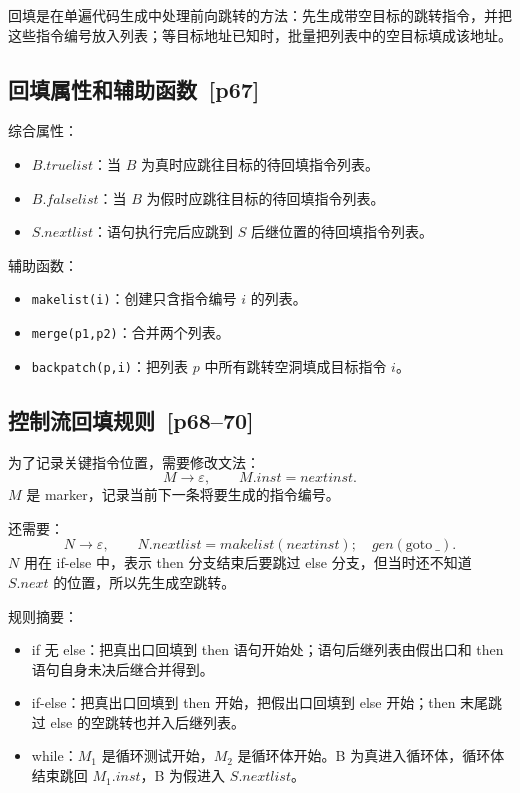 \documentclass[UTF8,fontset=none,11pt]{ctexart}
\newenvironment{defbox}[1][]{%
  \par\medskip\noindent{\color{defrule}\rule{\linewidth}{1.1pt}}\par\nopagebreak
  \noindent{\bfseries\color{defrule}#1}\par\nopagebreak\smallskip}%
  {\par\nopagebreak\smallskip\noindent{\color{defrule}\rule{\linewidth}{0.4pt}}\par\medskip}
\newcommand{\pg}[1]{\texorpdfstring{{\small\color{graytext}\,[p#1]}}{ [p#1]}}
\newcommand{\eps}{\varepsilon}
\begin{document}
\begin{defbox}[Backpatching]
回填是在单遍代码生成中处理前向跳转的方法：先生成带空目标的跳转指令，并把这些指令编号放入列表；等目标地址已知时，批量把列表中的空目标填成该地址。
\end{defbox}

\subsection{回填属性和辅助函数 \pg{67}}

综合属性：

\begin{itemize}
  \item \(B.truelist\)：当 \(B\) 为真时应跳往目标的待回填指令列表。
  \item \(B.falselist\)：当 \(B\) 为假时应跳往目标的待回填指令列表。
  \item \(S.nextlist\)：语句执行完后应跳到 \(S\) 后继位置的待回填指令列表。
\end{itemize}

辅助函数：

\begin{itemize}
  \item \texttt{makelist(i)}：创建只含指令编号 \(i\) 的列表。
  \item \texttt{merge(p1,p2)}：合并两个列表。
  \item \texttt{backpatch(p,i)}：把列表 \(p\) 中所有跳转空洞填成目标指令 \(i\)。
\end{itemize}

\subsection{控制流回填规则 \pg{68--70}}

为了记录关键指令位置，需要修改文法：
\[
M\to\eps,\qquad M.inst=nextinst.
\]
\(M\) 是 marker，记录当前下一条将要生成的指令编号。

还需要：
\[
N\to\eps,\qquad N.nextlist=makelist(nextinst);\quad gen(\mathrm{goto}\ \_).
\]
\(N\) 用在 if-else 中，表示 then 分支结束后要跳过 else 分支，但当时还不知道 \(S.next\) 的位置，所以先生成空跳转。

规则摘要：

\begin{itemize}
  \item if 无 else：把真出口回填到 then 语句开始处；语句后继列表由假出口和 then 语句自身未决后继合并得到。
  \item if-else：把真出口回填到 then 开始，把假出口回填到 else 开始；then 末尾跳过 else 的空跳转也并入后继列表。
  \item while：\(M_1\) 是循环测试开始，\(M_2\) 是循环体开始。B 为真进入循环体，循环体结束跳回 \(M_1.inst\)，B 为假进入 \(S.nextlist\)。
\end{itemize}
\end{document}
